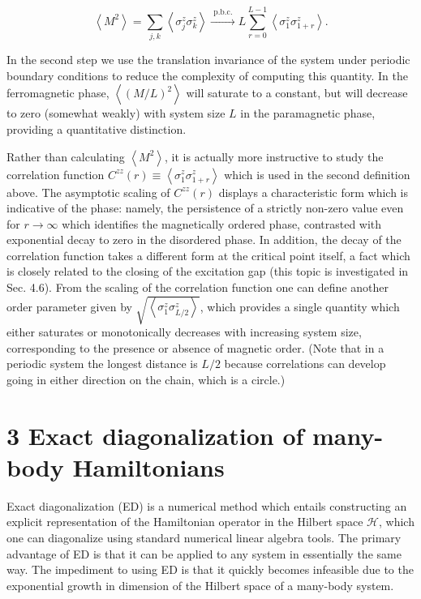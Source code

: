 \documentclass[12pt]{article}
\begin{document}
\begin{equation*}
\left\langle M^{2}\right\rangle=\sum_{j, k}\left\langle\sigma_{j}^{z} \sigma_{k}^{z}\right\rangle \xrightarrow{\text { p.b.c. }} L \sum_{r=0}^{L-1}\left\langle\sigma_{1}^{z} \sigma_{1+r}^{z}\right\rangle . \tag{9}
\end{equation*}


In the second step we use the translation invariance of the system under periodic boundary conditions to reduce the complexity of computing this quantity. In the ferromagnetic phase, $\left\langle(M / L)^{2}\right\rangle$ will saturate to a constant, but will decrease to zero (somewhat weakly) with system size $L$ in the paramagnetic phase, providing a quantitative distinction.

Rather than calculating $\left\langle M^{2}\right\rangle$, it is actually more instructive to study the correlation function $C^{z z}(r) \equiv\left\langle\sigma_{1}^{z} \sigma_{1+r}^{z}\right\rangle$ which is used in the second definition above. The asymptotic scaling of $C^{z z}(r)$ displays a characteristic form which is indicative of the phase: namely, the persistence of a strictly non-zero value even for $r \rightarrow \infty$ which identifies the magnetically ordered phase, contrasted with exponential decay to zero in the disordered phase. In addition, the decay of the correlation function takes a different form at the critical point itself, a fact which is closely related to the closing of the excitation gap (this topic is investigated in Sec. 4.6). From the scaling of the correlation function one can define another order parameter given by $\sqrt{\left\langle\sigma_{1}^{z} \sigma_{L / 2}^{z}\right\rangle}$, which provides a single quantity which either saturates or monotonically decreases with increasing system size, corresponding to the presence or absence of magnetic order. (Note that in a periodic system the longest distance is $L / 2$ because correlations can develop going in either direction on the chain, which is a circle.)

\section*{3 Exact diagonalization of many-body Hamiltonians}
Exact diagonalization (ED) is a numerical method which entails constructing an explicit representation of the Hamiltonian operator in the Hilbert space $\mathcal{H}$, which one can diagonalize using standard numerical linear algebra tools. The primary advantage of ED is that it can be applied to any system in essentially the same way. The impediment to using ED is that it quickly becomes infeasible due to the exponential growth in dimension of the Hilbert space of a many-body system.
\end{document}
